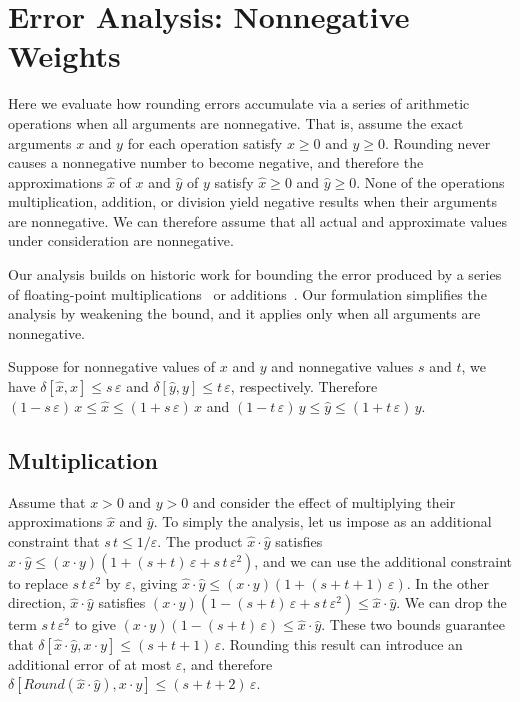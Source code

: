 \documentclass[letterpaper,USenglish,cleveref, autoref, thm-restate]{lipics-v2021}
\newcommand{\approximate}[1]{\hat{#1}}
\newcommand{\approxx}{\approximate{x}}
\newcommand{\approxy}{\approximate{y}}
\newcommand{\round}{\mathit{Round}}
\newcommand{\aerror}{\delta}
\newcommand{\roundepsilon}{\varepsilon}
\begin{document}
\section{Error Analysis: Nonnegative Weights}
\label{sect:nonneg}

Here we evaluate how rounding errors accumulate via a series of
arithmetic operations when all arguments are nonnegative.
That is, assume the exact arguments $x$ and $y$ for each operation satisfy $x \geq 0$ and $y \geq 0$.
Rounding never causes a nonnegative number to become negative, and therefore 
the approximations $\approxx$ of  $x$ and $\approxy$ of $y$ satisfy $\approxx \geq 0$ and $\approxy \geq 0$.
None of the operations multiplication, addition, or division yield negative results when their arguments are nonnegative.
We can therefore
assume that all actual and approximate values under consideration are
nonnegative.

Our analysis builds on historic work for bounding the error produced
by a series of floating-point
multiplications~\cite{muller:hfpa:2018,wilkinson:nm:1960,wilkinson:rounding:1963} or
additions~\cite{higham:siam:1993}.  Our formulation simplifies the analysis
by weakening the
bound, and it applies only when
all arguments are nonnegative.

Suppose for nonnegative values of $x$ and $y$ and nonnegative values $s$ and $t$, we have
$\aerror[\approxx, x] \leq s\, \roundepsilon$ and
$\aerror[\approxy, y] \leq t\, \roundepsilon$, respectively.
Therefore
$(1-s\,\roundepsilon)\, x \leq \approxx \leq (1+s\,\roundepsilon)\, x$ and
$(1-t\,\roundepsilon)\, y \leq \approxy \leq (1+t\,\roundepsilon)\, y$.


\subsection{Multiplication}

Assume that $x > 0$ and $y > 0$ and consider the effect of multiplying their approximations
$\approxx$ and $\approxy$.  To simply the analysis, let us impose as an additional constraint that $s\,t \leq 1/\roundepsilon$.
The product $\approxx \cdot \approxy$  satisfies
$\approxx \cdot \approxy \leq (x\cdot y) (1 + (s+t)\,\roundepsilon + s\,t\,\roundepsilon^2)$, and we can use the additional constraint to replace $s\,t\,\roundepsilon^2$ by $\roundepsilon$,
giving
$\approxx \cdot \approxy \leq (x\cdot y) (1 + (s+t+1)\,\roundepsilon)$.
In the other direction, $\approxx \cdot \approxy$ satisfies
$(x\cdot y) (1 - (s+t)\,\roundepsilon + s\,t\,\roundepsilon^2) \leq \approxx \cdot \approxy$.  We can drop the term
$s\,t\,\roundepsilon^2$ to give
$(x\cdot y) (1 - (s+t)\,\roundepsilon) \leq \approxx \cdot \approxy$.  These two bounds guarantee that
$\aerror[\approxx \cdot \approxy, x \cdot y] \leq (s+t+1)\,\roundepsilon$.
Rounding this result can introduce an additional error of at most $\roundepsilon$, and therefore
$\aerror[\round(\approxx \cdot \approxy), x \cdot y] \leq (s+t+2)\,\roundepsilon$.
\end{document}
